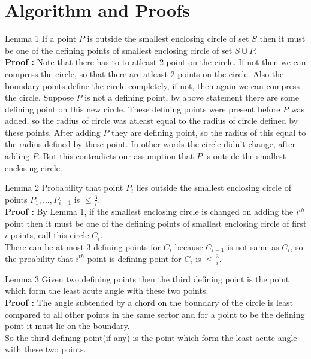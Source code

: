 \documentclass{beamer}
\begin{document}
\section{Algorithm and Proofs}


\begin{frame}{Lemma 1}
If a point $P$ is outside the smallest enclosing circle of set $S$ then it must be one of the defining points of smallest enclosing circle of set $S\cup P$.
\pause
\\
\textbf{Proof : } Note that there has to to atleast 2 point on the circle. If not then we can compress the circle, so that there are atleast 2 points on the circle. Also the boundary points define the circle completely, if not, then again we can compress the circle. Suppose $P$ is not a defining point, by above statement there are some defining point on this new circle. These defining points were present before $P$ was added, so the radius of circle was atleast equal to the radius of circle defined by these points. After adding $P$ they are defining point, so the radius of this equal to the radius defined by these point. In other words the circle didn't change, after adding $P$. But this contradicts our assumption that $P$ is outside the smallest enclosing circle.
\end{frame}

\begin{frame}{Lemma 2}
Probability that point $P_i$ lies outside the smallest enclosing circle of points $P_1, ... , P_{i-1}$ is $\leq \frac{3}{i}$.
\pause
\\
\textbf{Proof : } By Lemma 1, if the smallest enclosing circle is changed on adding the $i^{th}$ point then it must be one of the defining points of smallest enclosing circle of first $i$ points, call this circle $C_i$.
\\
\pause
There can be at most $3$ defining points for $C_i$ because $C_{i-1}$ is not same as $C_i$, so the proability that $i^{th}$ point is defining point for $C_i$ is $\leq \frac{3}{i}$.

\end{frame}
\begin{frame}{Lemma 3}
 Given two defining points then the third defining point is the point which form the least acute angle with these two points.
\pause
\\
\textbf{Proof : } The angle subtended by a chord on the boundary of the circle is least compared to all other points in the same sector and for a point to be the defining point it must lie on the boundary.
\\
\pause
So the third defining point(if any) is the point which form the least acute angle with these two points.    
\end{frame}
\end{document}
